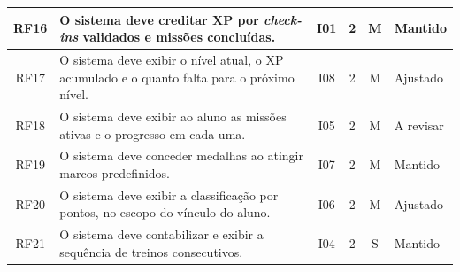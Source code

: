 \begin{quadro}[!htb]
\begin{tabular}{|c|p{7.3cm}|c|c|c|p{1.6cm}|}
    RF16 & O sistema deve creditar XP por \textit{check-ins} validados e missões concluídas. & I01 & 2 & M & Mantido \\ \hline
    RF17 & O sistema deve exibir o nível atual, o XP acumulado e o quanto falta para o próximo nível. & I08 & 2 & M & Ajustado \\ \hline
    RF18 & O sistema deve exibir ao aluno as missões ativas e o progresso em cada uma. & I05 & 2 & M & A revisar \\ \hline
    RF19 & O sistema deve conceder medalhas ao atingir marcos predefinidos. & I07 & 2 & M & Mantido \\ \hline
    RF20 & O sistema deve exibir a classificação por pontos, no escopo do vínculo do aluno. & I06 & 2 & M & Ajustado \\ \hline
    RF21 & O sistema deve contabilizar e exibir a sequência de treinos consecutivos. & I04 & 2 & S & Mantido \\ \hline
  \end{tabular}
\end{quadro}

